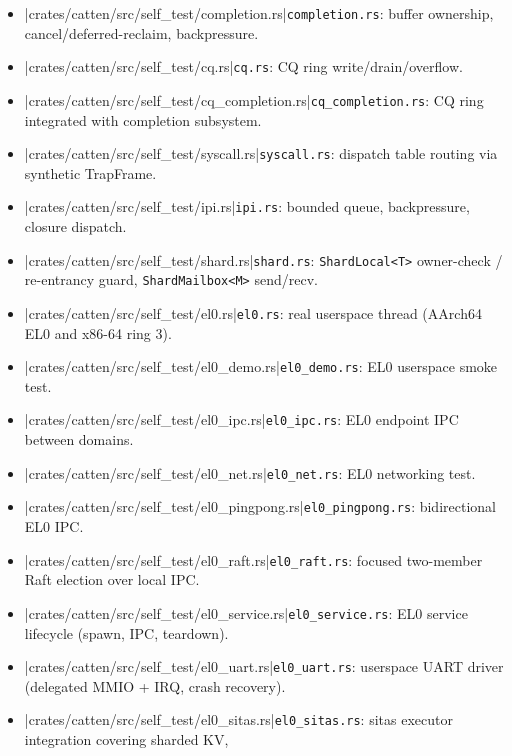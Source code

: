 \begin{itemize}
    \item \repofiletext|crates/catten/src/self_test/completion.rs|{\texttt{completion.rs}}: buffer ownership, cancel/deferred-reclaim,
        backpressure.
    \item \repofiletext|crates/catten/src/self_test/cq.rs|{\texttt{cq.rs}}: CQ ring write/drain/overflow.
    \item \repofiletext|crates/catten/src/self_test/cq_completion.rs|{\texttt{cq\_completion.rs}}: CQ ring integrated with completion
        subsystem.
    \item \repofiletext|crates/catten/src/self_test/syscall.rs|{\texttt{syscall.rs}}: dispatch table routing via synthetic
        TrapFrame.
    \item \repofiletext|crates/catten/src/self_test/ipi.rs|{\texttt{ipi.rs}}: bounded queue, backpressure, closure dispatch.
    \item \repofiletext|crates/catten/src/self_test/shard.rs|{\texttt{shard.rs}}: \texttt{ShardLocal<T>} owner-check /
        re-entrancy guard, \texttt{ShardMailbox<M>} send/recv.
    \item \repofiletext|crates/catten/src/self_test/el0.rs|{\texttt{el0.rs}}: real userspace thread (AArch64 EL0 and x86-64 ring 3).
    \item \repofiletext|crates/catten/src/self_test/el0_demo.rs|{\texttt{el0\_demo.rs}}: EL0 userspace smoke test.
    \item \repofiletext|crates/catten/src/self_test/el0_ipc.rs|{\texttt{el0\_ipc.rs}}: EL0 endpoint IPC between domains.
    \item \repofiletext|crates/catten/src/self_test/el0_net.rs|{\texttt{el0\_net.rs}}: EL0 networking test.
    \item \repofiletext|crates/catten/src/self_test/el0_pingpong.rs|{\texttt{el0\_pingpong.rs}}: bidirectional EL0 IPC.
    \item \repofiletext|crates/catten/src/self_test/el0_raft.rs|{\texttt{el0\_raft.rs}}: focused two-member Raft election over local IPC.
    \item \repofiletext|crates/catten/src/self_test/el0_service.rs|{\texttt{el0\_service.rs}}: EL0 service lifecycle (spawn, IPC,
        teardown).
    \item \repofiletext|crates/catten/src/self_test/el0_uart.rs|{\texttt{el0\_uart.rs}}: userspace UART driver (delegated MMIO +
        IRQ, crash recovery).
    \item \repofiletext|crates/catten/src/self_test/el0_sitas.rs|{\texttt{el0\_sitas.rs}}: sitas executor integration covering sharded KV,

\end{itemize}
